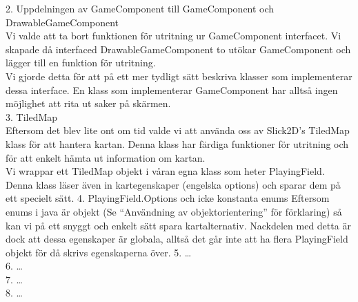 \vspace{11pt}
2. Uppdelningen av GameComponent till GameComponent och DrawableGameComponent\\
Vi valde att ta bort funktionen för utritning ur GameComponent interfacet. Vi skapade då interfaced DrawableGameComponent to utökar GameComponent och lägger till en funktion för utritning.\\
Vi gjorde detta för att på ett mer tydligt sätt beskriva klasser som implementerar dessa interface. En klass som implementerar GameComponent har alltså ingen möjlighet att rita ut saker på skärmen.\\
\vspace{11pt}
3. TiledMap\\
Eftersom det blev lite ont om tid valde vi att använda oss av Slick2D's TiledMap klass för att hantera kartan. Denna klass har färdiga funktioner för utritning och för att enkelt hämta ut information om kartan.\\
Vi wrappar ett TiledMap objekt i våran egna klass som heter PlayingField. Denna klass läser även in kartegenskaper (engelska options) och sparar dem på ett specielt sätt.
\vspace{11pt}
4. PlayingField.Options och icke konstanta enums
Eftersom enums i java är objekt (Se ``Användning av objektorientering'' för förklaring) så kan vi på ett snyggt och enkelt sätt spara kartalternativ. Nackdelen med detta är dock att dessa egenskaper är globala, alltså det går inte att ha flera PlayingField objekt för då skrivs egenskaperna över.
\vspace{11pt}
5. \ldots \\
\vspace{11pt}
6. \ldots \\
7. \ldots \\
8. \ldots \\
